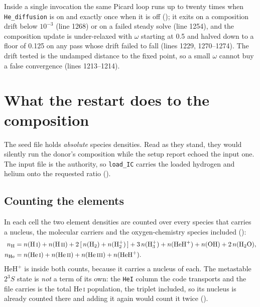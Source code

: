 \documentclass[english,a4paper]{my_memo}
\begin{document}
Inside a single invocation the same Picard loop runs up to twenty times when
\verb|He_diffusion| is on and exactly once when it is off
(); it exits on a composition drift below
$10^{-3}$ (line 1268) or on a failed steady solve (line 1254), and the
composition update is under-relaxed with $\omega$ starting at 0.5 and halved
down to a floor of 0.125 on any pass whose drift failed to fall (lines
1229, 1270--1274). The drift tested is the undamped distance to the fixed
point, so a small $\omega$ cannot buy a false convergence (lines
1213--1214).

\section{What the restart does to the composition}
\label{sec:redistribute}

The seed file holds \emph{absolute} species densities. Read as they stand,
they would silently run the donor's composition while the setup report
echoed the input one. The input file is the authority, so \verb|load_IC|
carries the loaded hydrogen and helium onto the requested ratio
().

\subsection{Counting the elements}

In each cell the two element densities are counted over every species that
carries a nucleus, the molecular carriers and the oxygen-chemistry species
included ():
%
\begin{align}
  n_{\rm H} &= n(\mathrm{H\,\textsc{i}}) + n(\mathrm{H\,\textsc{ii}})
     + 2\,[\,n(\mathrm{H_2}) + n(\mathrm{H_2^+})\,]
     + 3\,n(\mathrm{H_3^+}) + n(\mathrm{HeH^+})
     + n(\mathrm{OH}) + 2\,n(\mathrm{H_2O}),
  \label{eq:nH}\\
  n_{\rm He} &= n(\mathrm{He\,\textsc{i}}) + n(\mathrm{He\,\textsc{ii}})
     + n(\mathrm{He\,\textsc{iii}}) + n(\mathrm{HeH^+}).
  \label{eq:nHe}
\end{align}
%
$\mathrm{HeH^+}$ is inside both counts, because it carries a nucleus of
each. The metastable $2^3S$ state is \emph{not} a term of its own: the
\verb|HeI| column the code transports and the file carries is the total
He\,\textsc{i} population, the triplet included, so its nucleus is already
counted there and adding it again would count it twice
().
\end{document}
